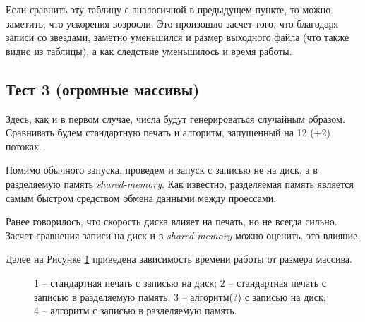 \documentclass[specialist,subf,href,colorlinks=true,14pt
,times,mtpro,specialist
]{disser}
\begin{document}
Если сравнить эту таблицу с аналогичной в предыдущем пункте, то можно заметить, что ускорения возросли.
Это произошло засчет того, что благодаря записи со звездами, заметно уменьшился и размер выходного файла (что также видно из таблицы), а как следствие уменьшилось и время работы.

\subsection{Тест 3 (огромные массивы)}
Здесь, как и в первом случае, числа будут генерироваться случайным образом.
Сравнивать будем стандартную печать и алгоритм, запущенный на 12 (+2) потоках.

Помимо обычного запуска, проведем и запуск с записью не на диск, а в разделяемую память \textit{shared-memory}.
Как известно, разделяемая память является самым быстром средством обмена данными между проессами.

Ранее говорилось, что скорость диска влияет на печать, но не всегда сильно.
Засчет сравнения записи на диск и в \textit{shared-memory} можно оценить, это влияние.

Далее на Рисунке \ref{grap} приведена зависимость времени работы от размера массива.
\begin{figure}[H]
\caption{
1 -- стандартная печать с записью на диск;
2 -- стандартная печать с записью в разделяемую память;
3 -- алгоритм(?) с записью на диск;
4 -- алгоритм с записью в разделяемую память.} \label{grap}
\end{figure}
\end{document}
